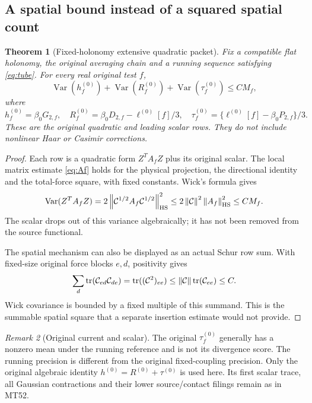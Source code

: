 \documentclass[11pt,letterpaper]{article}
\newtheorem{theorem}{Theorem}[section]
\theoremstyle{remark}\newtheorem{remark}[theorem]{Remark}
\newcommand{\Var}{\operatorname{Var}}\newcommand{\Cov}{\operatorname{Cov}}
\newcommand{\tr}{\operatorname{tr}}\newcommand{\Tr}{\operatorname{Tr}}
\newcommand{\norm}[1]{\left\lVert#1\right\rVert}
\begin{document}
\subsection{A spatial bound instead of a squared spatial count}

\begin{theorem}[Fixed-holonomy extensive quadratic packet]\label{thm:gaussian}
Fix a compatible flat holonomy, the original averaging chain and a running sequence satisfying \eqref{eq:tube}. For every real original test \(f\),
\begin{equation}\label{eq:gaussvar}
 \Var(h_f^{(0)})+\Var(R_f^{(0)})+\Var(\tau_f^{(0)})\le CM_f,
\end{equation}
where
\[
 h_f^{(0)}=\beta_0G_{2,f},\quad
 R_f^{(0)}=\beta_0D_{2,f}-\ell^{(0)}[f]/3,
 \quad \tau_f^{(0)}=\{\ell^{(0)}[f]-\beta_0P_{2,f}\}/3.
\]
These are the original quadratic and leading scalar rows. They do not include nonlinear Haar or Casimir corrections.
\end{theorem}
\begin{proof}
Each row is a quadratic form \(Z^TA_fZ\) plus its original scalar. The local matrix estimate \eqref{eq:Af} holds for the physical projection, the directional identity and the total-force square, with fixed constants. Wick's formula gives
\[
 \Var(Z^TA_fZ)=2\norm{\cC^{1/2}A_f\cC^{1/2}}_{\mathrm{HS}}^2
 \le2\norm{\cC}^2\norm{A_f}_{\mathrm{HS}}^2\le CM_f.
\]
The scalar drops out of this variance algebraically; it has not been removed from the source functional.

The spatial mechanism can also be displayed as an actual Schur row sum. With fixed-size original force blocks \(e,d\), positivity gives
\begin{equation}\label{eq:schur}
 \sum_d\tr(\cC_{ed}\cC_{de})
 =\tr((\cC^2)_{ee})
 \le\norm{\cC}\tr(\cC_{ee})\le C.
\end{equation}
Wick covariance is bounded by a fixed multiple of this summand. This is the summable spatial square that a separate insertion estimate would not provide.
\end{proof}

\begin{remark}[Original current and scalar]
The original \(\tau_f^{(0)}\) generally has a nonzero mean under the running reference and is not its divergence score. The running precision is different from the original fixed-coupling precision. Only the original algebraic identity \(h^{(0)}=R^{(0)}+\tau^{(0)}\) is used here. Its first scalar trace, all Gaussian contractions and their lower source/contact filings remain as in MT52.
\end{remark}
\end{document}
